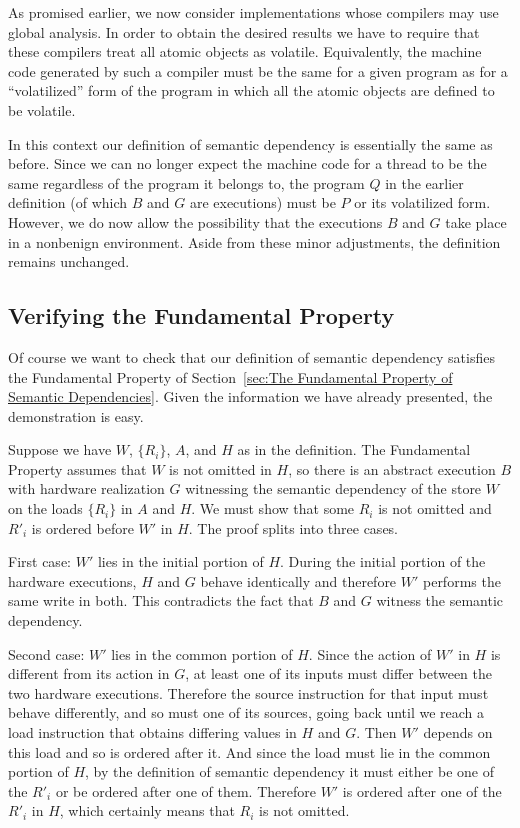 \documentclass[10]{article}
\begin{document}
As promised earlier, we now consider implementations whose compilers
may use global analysis.
In order to obtain the desired results we have to require that these
compilers treat all atomic objects as volatile.
Equivalently, the machine code generated by such a compiler must be
the same for a given program as for a ``volatilized'' form of the
program in which all the atomic objects are defined to be volatile.

In this context our definition of semantic dependency is essentially
the same as before.
Since we can no longer expect the machine code for a thread to be the
same regardless of the program it belongs to, the program $Q$ in the
earlier definition (of which $B$ and $G$ are executions) must be
$P$ or its volatilized form.
However, we do now allow the possibility that the executions $B$ and
$G$ take place in a nonbenign environment.
Aside from these minor adjustments, the definition remains unchanged.

\subsection{Verifying the Fundamental Property}
\label{sec:Verifying the Fundamental Property}

Of course we want to check that our definition of semantic dependency
satisfies the Fundamental Property of
Section~\ref{sec:The Fundamental Property of Semantic Dependencies}.
Given the information we have already presented, the demonstration is
easy.

Suppose we have $W$, $\{R_i\}$, $A$, and $H$ as in the definition.
The Fundamental Property assumes that $W$ is not omitted in $H$, so
there is an abstract execution $B$ with hardware realization $G$
witnessing the semantic dependency of the store $W$ on the loads
$\{R_i\}$ in $A$ and $H$.
We must show that some $R_i$ is not omitted and $R'_i$ is ordered
before $W'$ in $H$.
The proof splits into three cases.

First case: $W'$ lies in the initial portion of $H$.
During the initial portion of the hardware executions, $H$ and $G$
behave identically and therefore $W'$ performs the same write in
both.
This contradicts the fact that $B$ and $G$ witness the semantic
dependency.

Second case: $W'$ lies in the common portion of $H$.
Since the action of $W'$ in $H$ is different from its action in $G$,
at least one of its inputs must differ between the two hardware
executions.
Therefore the source instruction for that input must behave
differently, and so must one of its sources, going back until we reach
a load instruction that obtains differing values in $H$ and $G$.
Then $W'$ depends on this load and so is ordered after it.
And since the load must lie in the common portion of $H$, by the
definition of semantic dependency it must either be one of the
$R'_i$ or be ordered after one of them.
Therefore $W'$ is ordered after one of the $R'_i$ in $H$,
which certainly means that $R_i$ is not omitted.
\end{document}
